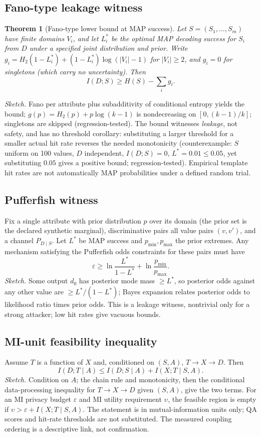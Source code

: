 \documentclass[11pt,a4paper]{article}
\newtheorem{theorem}{Theorem}
\begin{document}
\subsection{Fano-type leakage witness}
\begin{theorem}[Fano-type lower bound at MAP success]
Let $S=(S_1,\dots,S_m)$ have finite domains $V_i$, and let $L_i^{*}$ be the optimal MAP decoding success for $S_i$ from $D$ under a specified joint distribution and prior. Write $g_i=H_2(1-L_i^{*})+(1-L_i^{*})\log(|V_i|-1)$ for $|V_i|\ge2$, and $g_i=0$ for singletons (which carry no uncertainty). Then
\[
I(D;S)\ge H(S)-\textstyle\sum_i g_i.
\]
\end{theorem}
\emph{Sketch.} Fano per attribute plus subadditivity of conditional entropy yields the bound; $g(p)=H_2(p)+p\log(k-1)$ is nondecreasing on $[0,(k-1)/k]$; singletons are skipped (regression-tested). The bound witnesses \emph{leakage}, not safety, and has no threshold corollary: substituting a larger threshold for a smaller actual hit rate reverses the needed monotonicity (counterexample: $S$ uniform on 100 values, $D$ independent, $I(D;S)=0$, $L^{*}=0.01\le0.05$, yet substituting $0.05$ gives a positive bound; regression-tested). Empirical template hit rates are not automatically MAP probabilities under a defined random trial.

\subsection{Pufferfish witness}
Fix a single attribute with prior distribution $p$ over its domain (the prior set is the declared synthetic marginal), discriminative pairs all value pairs $(v,v')$, and a channel $P_{D\mid S}$. Let $L^{*}$ be MAP success and $p_{\min},p_{\max}$ the prior extremes. Any mechanism satisfying the Pufferfish odds constraints for these pairs must have
\[
\varepsilon\ge\ln\frac{L^{*}}{1-L^{*}}+\ln\frac{p_{\min}}{p_{\max}}.
\]
\emph{Sketch.} Some output $d_0$ has posterior mode mass $\ge L^{*}$, so posterior odds against any other value are $\ge L^{*}/(1-L^{*})$; Bayes expansion relates posterior odds to likelihood ratio times prior odds. This is a leakage witness, nontrivial only for a strong attacker; low hit rates give vacuous bounds.

\subsection{MI-unit feasibility inequality}
Assume $T$ is a function of $X$ and, conditioned on $(S,A)$, $T\to X\to D$. Then
\[
I(D;T\mid A)\le I(D;S\mid A)+I(X;T\mid S,A).
\]
\emph{Sketch.} Condition on $A$; the chain rule and monotonicity, then the conditional data-processing inequality for $T\to X\to D$ given $(S,A)$, give the two terms. For an MI privacy budget $\varepsilon$ and MI utility requirement $\upsilon$, the feasible region is empty if $\upsilon>\varepsilon+I(X;T\mid S,A)$. The statement is in mutual-information units only; QA scores and hit-rate thresholds are not substituted. The measured coupling ordering is a descriptive link, not confirmation.
\end{document}
